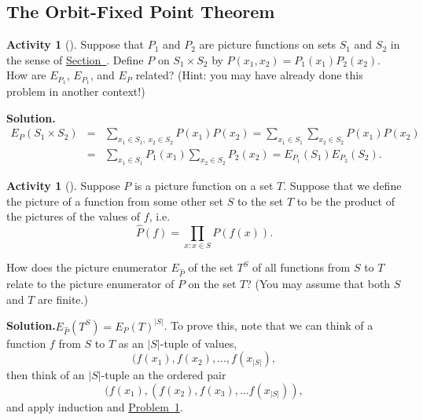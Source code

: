 \documentclass[10pt,]{book}
\theoremstyle{plain}
\theoremstyle{definition}
\newtheorem{activity}[project]{Activity}
\numberwithin{equation}{chapter}
\newcommand{\amp}{&}
\begin{document}
\subsection[{The Orbit-Fixed Point Theorem}]{The Orbit-Fixed Point Theorem}\label{subsection-67}
\begin{activity}[]\label{ProdPrincPictureEnumerators}
Suppose that \(P_1\) and \(P_2\) are picture functions on sets \(S_1\) and \(S_2\) in the sense of \hyperref[picturefunction]{Section~}. Define \(P\) on \(S_1 \times
S_2\) by \(P(x_1,x_2) = P_1(x_1)P_2(x_2)\). How are \(E_{P_1}\), \(E_{P_1}\), and \(E_{P}\) related? (Hint: you may have already done this problem in another context!)%
\par\medskip\noindent%
\textbf{Solution.}\quad %
\begin{align*}
E_P(S_1\times S_2)\amp =\amp \sum_{x_1\in S_1,\ x_2\in
S_2}P(x_1)P(x_2)=\sum_{x_1\in S_1}\sum_{x_2 \in S_2}P(x_1)P(x_2)\\
\amp =\amp  \sum_{x_1\in
S_1}P_1(x_1)\sum_{x_2 \in S_2}P_2(x_2)=E_{P_1}(S_1)E_{P_2}(S_2).
\end{align*}
\end{activity}
\begin{activity}[]\label{PictureEnumeratorforFunctions}
Suppose \(P\) is a picture function on a set \(T\). Suppose that we define the picture of a function from some other set \(S\) to the set \(T\) to be the product of the pictures of the values of \(f\), i.e.%
\begin{equation*}
\hat P(f) = \prod_{x:x\in S}P(f(x)).
\end{equation*}
%
\par
How does the picture enumerator \(E_{\hat P}\) of the set \(T^S\) of all functions from \(S\) to \(T\) relate to the picture enumerator of \(P\) on the set \(T\)? (You may assume that both \(S\) and \(T\) are finite.)%
\par\medskip\noindent%
\textbf{Solution.}\quad \(E_{\hat P}(T^S)=E_P(T)^{|S|}\). To prove this, note that we can think of a function \(f\) from \(S\) to \(T\) as an \(|S|\)-tuple of values,%
\begin{equation*}
(f(x_1),f(x_2),\ldots,
f(x_{|S|}),
\end{equation*}
then think of an \(|S|\)-tuple an the ordered pair%
\begin{equation*}
(f(x_1),(f(x_2),
f(x_3),\ldots f(x_{|S|})),
\end{equation*}
and apply induction and \hyperref[ProdPrincPictureEnumerators]{Problem~\ref{ProdPrincPictureEnumerators}}.%
\end{activity}
\end{document}
